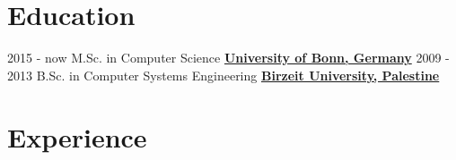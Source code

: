 \documentclass[letterpaper]{twentysecondcv} %
\begin{document}
\makeprofile %

\section{Education}

\begin{twenty} %
	\twentyitem
    	{2015 - now}
        {}
        {M.Sc.  in  Computer Science}
        {\href{https://www.uni-bonn.de/}{\textbf{University of Bonn, Germany}}}
        {}
        {}
	\twentyitem
    	{2009 - 2013}
		{}
        {B.Sc. in Computer Systems Engineering }
        {\href{https://www.birzeit.edu/en}{\textbf{Birzeit University,  Palestine}}}
        {}
        {}
\end{twenty}




\section{Experience}
\end{document}
